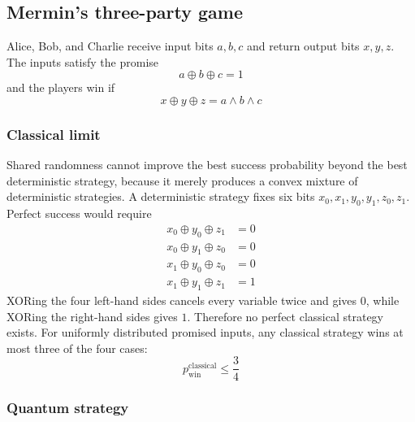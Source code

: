 \subsection{Mermin's three-party game}\label{sec:mermin-pseudo-telepathy}

Alice, Bob, and Charlie receive input bits \(a,b,c\) and return output bits \(x,y,z\).
The inputs satisfy the promise
\[
a\oplus b\oplus c
=
1
\]
and the players win if
\[
x\oplus y\oplus z
=
a\wedge b\wedge c
\]

\subsubsection*{Classical limit}

Shared randomness cannot improve the best success probability beyond the best deterministic strategy, because it merely produces a convex mixture of deterministic strategies.
A deterministic strategy fixes six bits
\(
x_0,x_1,y_0,y_1,z_0,z_1
\).
Perfect success would require
\[
\begin{aligned}
x_0\oplus y_0\oplus z_1 &= 0\\
x_0\oplus y_1\oplus z_0 &= 0\\
x_1\oplus y_0\oplus z_0 &= 0\\
x_1\oplus y_1\oplus z_1 &= 1
\end{aligned}
\]
XORing the four left-hand sides cancels every variable twice and gives \(0\), while XORing the right-hand sides gives \(1\).
Therefore no perfect classical strategy exists.
For uniformly distributed promised inputs, any classical strategy wins at most three of the four cases:
\[
p_{\mathrm{win}}^{\mathrm{classical}}
\leq
\frac34
\]

\subsubsection*{Quantum strategy}

